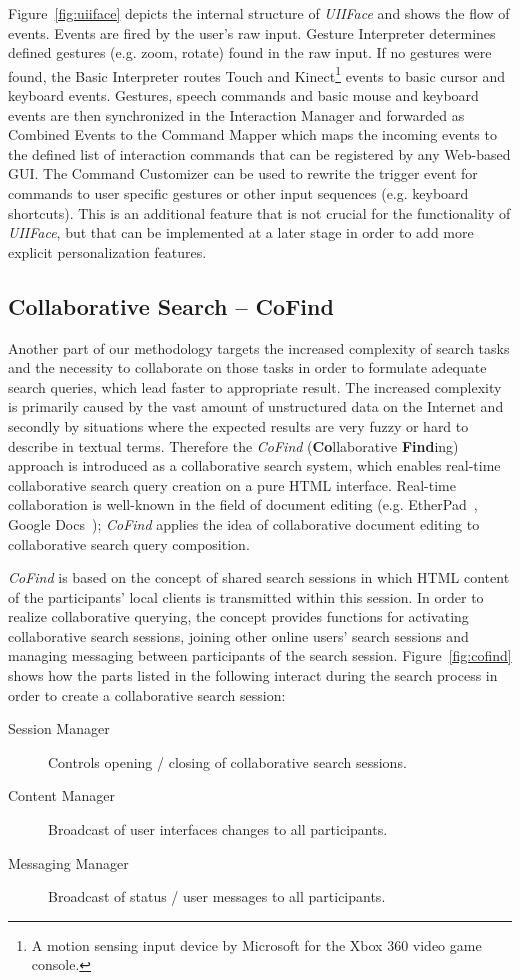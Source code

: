 \documentclass[runningheads,a4paper]{llncs} \usepackage[utf8]{inputenc}
\begin{document}
Figure~\ref{fig:uiiface} depicts the internal structure of \emph{UIIFace} and shows the flow of events. Events are fired by the user's raw input. Gesture Interpreter determines defined gestures (e.g. zoom, rotate) found in the raw input. If no
gestures were found, the Basic Interpreter routes Touch and Kinect\footnote{A motion sensing input device by Microsoft for the Xbox 360 video game console.} events to basic cursor and keyboard events. Gestures, speech commands and basic mouse and keyboard events are then synchronized in the Interaction Manager and forwarded as Combined Events to the Command Mapper which maps the incoming events to the defined list of interaction commands that can be registered by any Web-based GUI. The Command Customizer can be used to rewrite the trigger event for commands to user specific gestures or other input sequences (e.g. keyboard shortcuts). This is an additional feature that is not crucial for the functionality of \emph{UIIFace}, but that can be implemented at a later stage in order to add more explicit personalization features.

\subsection{Collaborative Search -- CoFind}
Another part of our methodology targets the increased complexity of search tasks and the necessity to collaborate on those tasks in order to formulate adequate search queries, which lead faster to appropriate result. The increased
complexity is primarily caused by the vast amount of unstructured data on the Internet and secondly by situations where the expected results are very fuzzy or hard to describe in textual terms. Therefore the \emph{CoFind} (\textbf{Co}llaborative \textbf{Find}ing) approach is introduced as a collaborative search system, which enables real-time collaborative search query creation on a pure HTML interface. Real-time collaboration is well-known in the field of document editing (e.g. EtherPad~\cite{etherpad}, Google  Docs~\cite{googledocs}); \emph{CoFind} applies the idea of collaborative document editing to collaborative search query composition.

\emph{CoFind} is based on the concept of shared search sessions in which HTML content of the participants' local clients is transmitted within this session. In order to realize collaborative querying, the concept provides functions for activating collaborative search sessions, joining other online users' search sessions and managing messaging between participants of the search session. Figure~\ref{fig:cofind} shows how the parts listed in the following interact during the search process in order to create a collaborative search session:
\begin{description}
  \item [Session Manager] Controls opening / closing of collaborative search sessions.
  \item [Content Manager] Broadcast of user interfaces changes to all participants.
  \item [Messaging Manager] Broadcast of status / user messages to all participants.
\end{description}
\end{document}
